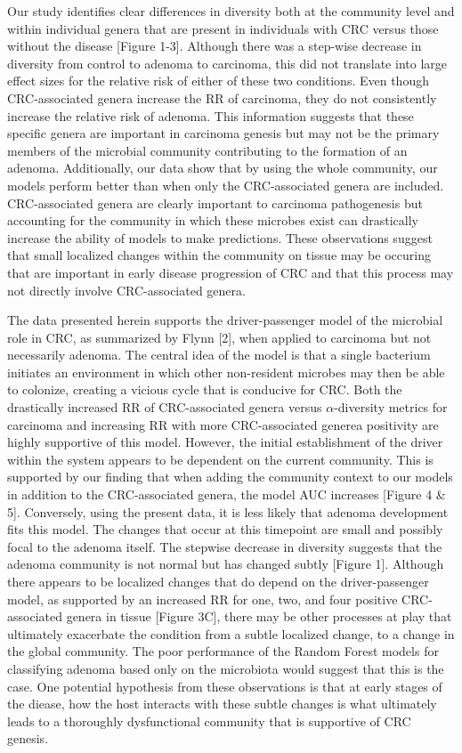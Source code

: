 \documentclass[12pt,]{article}
\begin{document}
Our study identifies clear differences in diversity both at the
community level and within individual genera that are present in
individuals with CRC versus those without the disease {[}Figure 1-3{]}.
Although there was a step-wise decrease in diversity from control to
adenoma to carcinoma, this did not translate into large effect sizes for
the relative risk of either of these two conditions. Even though
CRC-associated genera increase the RR of carcinoma, they do not
consistently increase the relative risk of adenoma. This information
suggests that these specific genera are important in carcinoma genesis
but may not be the primary members of the microbial community
contributing to the formation of an adenoma. Additionally, our data show
that by using the whole community, our models perform better than when
only the CRC-associated genera are included. CRC-associated genera are
clearly important to carcinoma pathogenesis but accounting for the
community in which these microbes exist can drastically increase the
ability of models to make predictions. These observations suggest that
small localized changes within the community on tissue may be occuring
that are important in early disease progression of CRC and that this
process may not directly involve CRC-associated genera.

The data presented herein supports the driver-passenger model of the
microbial role in CRC, as summarized by Flynn {[}2{]}, when applied to
carcinoma but not necessarily adenoma. The central idea of the model is
that a single bacterium initiates an environment in which other
non-resident microbes may then be able to colonize, creating a vicious
cycle that is conducive for CRC. Both the drastically increased RR of
CRC-associated genera versus \(\alpha\)-diversity metrics for carcinoma
and increasing RR with more CRC-associated generea positivity are highly
supportive of this model. However, the initial establishment of the
driver within the system appears to be dependent on the current
community. This is supported by our finding that when adding the
community context to our models in addition to the CRC-associated
genera, the model AUC increases {[}Figure 4 \& 5{]}. Conversely, using
the present data, it is less likely that adenoma development fits this
model. The changes that occur at this timepoint are small and possibly
focal to the adenoma itself. The stepwise decrease in diversity suggests
that the adenoma community is not normal but has changed subtly
{[}Figure 1{]}. Although there appears to be localized changes that do
depend on the driver-passenger model, as supported by an increased RR
for one, two, and four positive CRC-associated genera in tissue
{[}Figure 3C{]}, there may be other processes at play that ultimately
exacerbate the condition from a subtle localized change, to a change in
the global community. The poor performance of the Random Forest models
for classifying adenoma based only on the microbiota would suggest that
this is the case. One potential hypothesis from these observations is
that at early stages of the diease, how the host interacts with these
subtle changes is what ultimately leads to a thoroughly dysfunctional
community that is supportive of CRC genesis.
\end{document}
